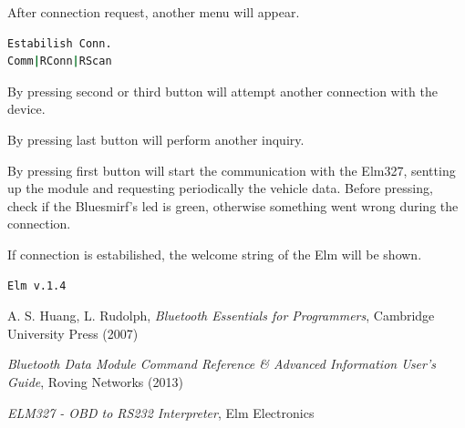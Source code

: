 \documentclass[twoside]{article}
\begin{document}
\begin{multicols}{2}
After connection request, another menu will appear.

\begin{lstlisting}[language=bash]
Estabilish Conn.
Comm|RConn|RScan
\end{lstlisting}

By pressing second or third button will attempt another connection with the device.

By pressing last button will perform another inquiry.

By pressing first button will start the communication with the Elm327, sentting up the module and requesting periodically the vehicle data. Before pressing, check if the Bluesmirf's led is green, otherwise something went wrong during the connection.

If connection is estabilished, the welcome string of the Elm will be shown.

\begin{lstlisting}[language=bash]
Elm v.1.4
\end{lstlisting}






\begin{thebibliography}{99} %

\bibitem{} A. S. Huang, L. Rudolph,
  \emph{Bluetooth Essentials for Programmers},
  Cambridge University Press (2007)

\bibitem{}
  \emph{Bluetooth Data Module Command Reference \& Advanced Information User's Guide},
  Roving Networks (2013)
  
\bibitem{}
  \emph{ELM327 - OBD to RS232 Interpreter},
  Elm Electronics
 
\end{thebibliography}


\end{multicols}
\end{document}

